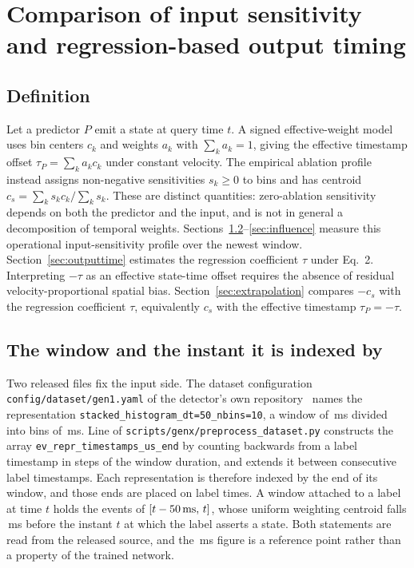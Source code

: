 \documentclass[10pt,twocolumn,letterpaper]{article}
\begin{document}
\section{Comparison of input sensitivity and regression-based output timing}
\label{sec:predictor}

\subsection{Definition}

Let a predictor $P$ emit a state at query time $t$. A signed effective-weight
model uses bin centers $c_k$ and weights $a_k$ with $\sum_k a_k=1$, giving the
effective timestamp offset $\tau_P=\sum_k a_kc_k$ under constant velocity. The
empirical ablation profile instead assigns non-negative sensitivities $s_k\geq0$
to bins and has centroid $c_s=\sum_k s_kc_k/\sum_k s_k$. These are distinct
quantities: zero-ablation sensitivity depends on both the predictor and the
input, and is not in general a decomposition of temporal weights. Sections~\ref{sec:window}--\ref{sec:influence} measure this
operational input-sensitivity profile over the newest window. Section~\ref{sec:outputtime}
estimates the regression coefficient $\tau$ under Eq.~2. Interpreting $-\tau$ as an
effective state-time offset requires the absence of residual velocity-proportional
spatial bias.
Section~\ref{sec:extrapolation} compares $-c_s$ with the regression coefficient
$\tau$, equivalently $c_s$ with the effective timestamp $\tau_P=-\tau$.

\subsection{The window and the instant it is indexed by}
\label{sec:window}

Two released files fix the input side. The dataset configuration
\texttt{config/dataset/gen1.yaml} of the detector's own
repository~\cite{gehrig2023rvt} names the representation
\texttt{stacked\_histogram\_dt=50\_nbins=10}, a window of \rvtWindow\,ms divided
into \rvtBins{} bins of \rvtBinWidth\,ms. Line \rvtSourceLine{} of
\texttt{scripts/genx/preprocess\_dataset.py} constructs the array
\texttt{ev\_repr\_timestamps\_us\_end} by counting backwards from a label
timestamp in steps of the window duration, and extends it between consecutive
label timestamps. Each representation is therefore indexed by the end of its
window, and those ends are placed on label times. A window attached to a label at
time $t$ holds the events of $[t-50\,\mathrm{ms},\,t]$, whose uniform
weighting centroid falls \rvtCentroidMag\,ms before the instant $t$ at which the
label asserts a state. Both statements are read from the released source, and
the \rvtCentroidMag\,ms figure is a reference point rather than a property of
the trained network.
\end{document}
